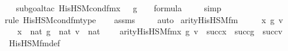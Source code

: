 \begin{isabellebody}
\ \ \isamarkupfalse%
{\isacharparenleft}{\kern0pt}subgoal{\isacharunderscore}{\kern0pt}tac\ {\isachardoublequoteopen}His{\isacharunderscore}{\kern0pt}HS{\isacharunderscore}{\kern0pt}M{\isacharunderscore}{\kern0pt}cond{\isacharunderscore}{\kern0pt}fm{\isacharprime}{\kern0pt}{\isacharparenleft}{\kern0pt}x{\isacharprime}{\kern0pt}\ {\isacharhash}{\kern0pt}{\isacharplus}{\kern0pt}\ {}{\isacharcomma}{\kern0pt}\ g\ {\isacharhash}{\kern0pt}{\isacharplus}{\kern0pt}\ {}{\isacharparenright}{\kern0pt}\ {\isasymin}\ formula{\isachardoublequoteclose}{\isacharparenright}{\kern0pt}\isanewline
\ \ \ \isamarkupfalse%
\ simp\isanewline
\ \ \isamarkupfalse%
{\isacharparenleft}{\kern0pt}rule\ His{\isacharunderscore}{\kern0pt}HS{\isacharunderscore}{\kern0pt}M{\isacharunderscore}{\kern0pt}cond{\isacharunderscore}{\kern0pt}fm{\isacharprime}{\kern0pt}{\isacharunderscore}{\kern0pt}type{\isacharparenright}{\kern0pt}\isanewline
\ \ \isamarkupfalse%
\ assms\ \isanewline
\ \ \isamarkupfalse%
\ auto%
\endisatagproof
{\isafoldproof}%
%
\isadelimproof
\isanewline
%
\endisadelimproof
\isanewline
{}\isamarkupfalse%
\ arity{\isacharunderscore}{\kern0pt}His{\isacharunderscore}{\kern0pt}HS{\isacharunderscore}{\kern0pt}M{\isacharunderscore}{\kern0pt}fm\ {\isacharcolon}{\kern0pt}\ \isanewline
\ \ \ x{\isacharprime}{\kern0pt}\ g\ v\ \isanewline
\ \ \ {\isachardoublequoteopen}x{\isacharprime}{\kern0pt}\ {\isasymin}\ nat{\isachardoublequoteclose}\ {\isachardoublequoteopen}g\ {\isasymin}\ nat{\isachardoublequoteclose}\ {\isachardoublequoteopen}v\ {\isasymin}\ nat{\isachardoublequoteclose}\ \isanewline
\ \ \ {\isachardoublequoteopen}arity{\isacharparenleft}{\kern0pt}His{\isacharunderscore}{\kern0pt}HS{\isacharunderscore}{\kern0pt}M{\isacharunderscore}{\kern0pt}fm{\isacharparenleft}{\kern0pt}x{\isacharprime}{\kern0pt}{\isacharcomma}{\kern0pt}\ g{\isacharcomma}{\kern0pt}\ v{\isacharparenright}{\kern0pt}{\isacharparenright}{\kern0pt}\ {\isasymle}\ succ{\isacharparenleft}{\kern0pt}x{\isacharprime}{\kern0pt}{\isacharparenright}{\kern0pt}\ {\isasymunion}\ succ{\isacharparenleft}{\kern0pt}g{\isacharparenright}{\kern0pt}\ {\isasymunion}\ succ{\isacharparenleft}{\kern0pt}v{\isacharparenright}{\kern0pt}{\isachardoublequoteclose}\ \isanewline
%
\isadelimproof
\ \ %
\endisadelimproof
%
\isatagproof
{}\isamarkupfalse%
\ His{\isacharunderscore}{\kern0pt}HS{\isacharunderscore}{\kern0pt}M{\isacharunderscore}{\kern0pt}fm{\isacharunderscore}{\kern0pt}def\ \isanewline

\end{isabellebody}
